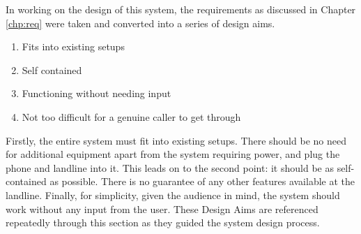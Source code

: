 \documentclass[main.tex]{subfiles}
\begin{document}
In working on the design of this system, the requirements as discussed in Chapter \ref{chp:req} were taken and converted into a series of design aims.

\begin{enumerate}
	\item Fits into existing setups
	\item Self contained
	\item Functioning without needing input
	\item Not too difficult for a genuine caller to get through
\end{enumerate}

Firstly, the entire system must fit into existing setups. There should be no need for additional equipment apart from the system requiring power, and plug the phone and landline into it. This leads on to the second point: it should be as self-contained as possible. There is no guarantee of any other features available at the landline. Finally, for simplicity, given the audience in mind, the system should work without any input from the user. These Design Aims are referenced repeatedly through this section as they guided the system design process.
\end{document}
